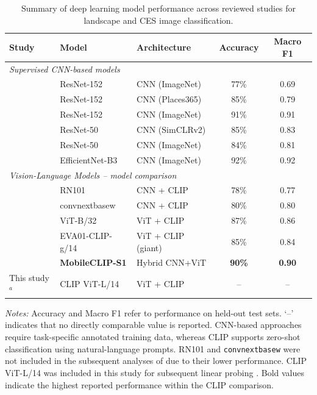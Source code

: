 \documentclass[11pt]{article}
\renewcommand{\_}{\textunderscore\allowbreak{}}
\begin{document}
\begin{table}[ht]
\centering
\caption{Summary of deep learning model performance across reviewed studies 
for landscape and CES image classification.}
\label{tab:model_comparison}
\renewcommand{\arraystretch}{1.3}
\begin{tabular}{lllcc}
\toprule
\textbf{Study} & \textbf{Model} & \textbf{Architecture} & \textbf{Accuracy} & \textbf{Macro F1} \\
\midrule
\multicolumn{5}{l}{\textit{Supervised CNN-based models}} \\
\midrule
\citet{cardoso_classifying_2022}
    & ResNet-152         & CNN (ImageNet)     & 77\%  & 0.69 \\
\citet{lingua_valuing_2022}
    & ResNet-152         & CNN (Places365)    & 85\%  & 0.79 \\
\citet{comalada_modelling_2025}
    & ResNet-152         & CNN (ImageNet)     & 91\%  & 0.91 \\
\citet{xu_revealing_2025}
    & ResNet-50          & CNN (SimCLRv2)     & 85\%  & 0.83 \\
\citet{you_mapping_2026}
    & ResNet-50          & CNN (ImageNet)     & 84\%  & 0.81 \\
\citet{chen_using_2025}
    & EfficientNet-B3    & CNN (ImageNet)     & 92\%  & 0.92 \\
\midrule
\multicolumn{5}{l}{\textit{Vision-Language Models -- model comparison 
\citet{liao_mapping_2025}}} \\
\midrule
\citet{liao_mapping_2025}
    & RN101              & CNN + CLIP         & 78\%  & 0.77 \\
\citet{liao_mapping_2025}
    & convnext\_base\_w  & CNN + CLIP         & 80\%  & 0.80 \\
\citet{liao_mapping_2025}
    & ViT-B/32           & ViT + CLIP         & 87\%  & 0.86 \\
\citet{liao_mapping_2025}
    & EVA01-CLIP-g/14    & ViT + CLIP (giant) & 85\%  & 0.84 \\
\citet{liao_mapping_2025}
    & \textbf{MobileCLIP-S1} & Hybrid CNN+ViT & \textbf{90\%} & \textbf{0.90} \\
This study$^{a}$
    & CLIP ViT-L/14      & ViT + CLIP         & --    & --   \\
\bottomrule
\end{tabular}
\begin{minipage}{\textwidth}
\bigskip\raggedright\small
\textit{Notes:} Accuracy and Macro F1 refer to performance on held-out test sets. `--' indicates that no directly comparable value is reported. CNN-based approaches require task-specific annotated training data, whereas CLIP supports zero-shot classification using natural-language prompts. RN101 and \texttt{convnext\_base\_w} were not included in the subsequent analyses of \citet{liao_mapping_2025} due to their lower performance. CLIP ViT-L/14 was included in this study for subsequent linear probing \citep{radford_learning_2021}. Bold values indicate the highest reported performance within the CLIP comparison. 
\end{minipage}
\end{table}
\end{document}
